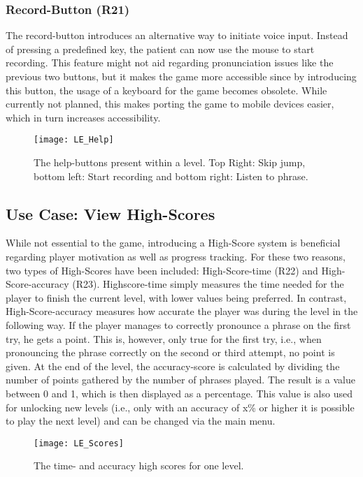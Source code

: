 \documentclass[draft,final]{vutinfth} %
\begin{document}
\subsubsection{Record-Button (R21)}
The record-button introduces an alternative way to initiate voice input. Instead of pressing a predefined key, the patient can now use the mouse to start recording. This feature might not aid regarding pronunciation issues like the previous two buttons, but it makes the game more accessible since by introducing this button, the usage of a keyboard for the game becomes obsolete. While currently not planned, this makes porting the game to mobile devices easier, which in turn increases accessibility.


\begin{figure}
\begin{center}
\texttt{[image: LE\_Help]}
\end{center}
\caption{The help-buttons present within a level. Top Right: Skip jump, bottom left: Start recording and bottom right: Listen to phrase.}
\end{figure}
\subsection{Use Case: View High-Scores}
While not essential to the game, introducing a High-Score system is beneficial regarding player motivation as well as progress tracking. For these two reasons, two types of High-Scores have been included: High-Score-time (R22) and High-Score-accuracy (R23). Highscore-time simply measures the time needed for the player to finish the current level, with lower values being preferred. In contrast, High-Score-accuracy measures how accurate the player was during the level in the following way. If the player manages to correctly pronounce a phrase on the first try, he gets a point. This is, however, only true for the first try, i.e., when pronouncing the phrase correctly on the second or third attempt, no point is given. At the end of the level, the accuracy-score is calculated by dividing the number of points gathered by the number of phrases played. The result is a value between 0 and 1, which is then displayed as a percentage. This value is also used for unlocking new levels (i.e., only with an accuracy of x\% or higher it is possible to play the next level) and can be changed via the main menu.

\begin{figure}
\begin{center}
\texttt{[image: LE\_Scores]}
\end{center}
\caption{The time- and accuracy high scores for one level.}
\end{figure}
\end{document}
